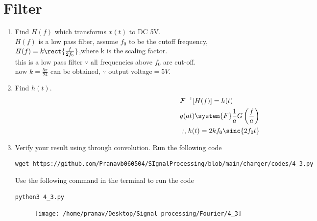 \documentclass[journal,12pt,twocolumn]{IEEEtran}
\renewcommand\thesection{\arabic{section}}
\begin{document}
\section{Filter}
\begin{enumerate}[label=\thesection.\arabic*
,ref=\thesection.\theenumi]
\item Find $H(f)$ which transforms $x(t)$ to DC 5V.\\
\solution $H(f)$ is a low pass filter, assume $f_0$ to be the cutoff frequency,
\\
$H(f)=k \rect{\frac{f}{2f_0}}$,where k is the scaling factor.\\
this is a low pass filter $\because$ all frequencies above $f_0$ are cut-off.\\
now $k=\frac{5\pi}{24}$ can be obtained, $\because$ output voltage$=5 V$.
\item Find $h(t)$.\\
\solution \begin{align}
&\mathcal{F}^{-1}[H(f)]=h(t)\\
& g(at)\system{F}\frac{1}{a}G\left(\frac{f}{a}\right)\\
&\therefore h(t)=2kf_0 \sinc{2f_0 t}
\end{align}
\item Verify your result using  through convolution.
	\solution 	Run the following code 
\begin{lstlisting}
wget https://github.com/Pranavb060504/SIgnalProcessing/blob/main/charger/codes/4_3.py
\end{lstlisting}
Use the following command in the terminal to run the code
\begin{lstlisting}
python3 4_3.py
\end{lstlisting}
	    \begin{figure}[!ht]
			\centering
			\texttt{[image: /home/pranav/Desktop/Signal processing/Fourier/4\_3]}
			\caption{}
			\label{fig:4_3}
\end{figure}

\end{enumerate}
\end{document}
